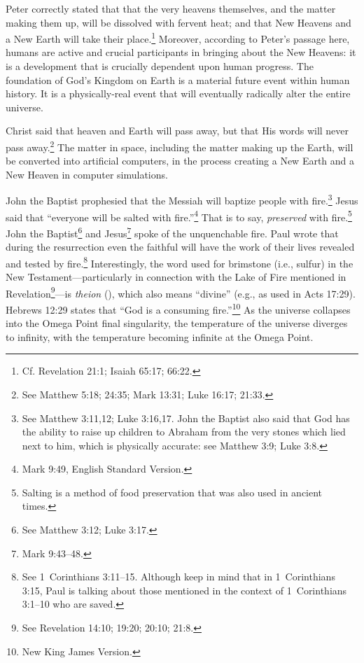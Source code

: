 \documentclass[letterpaper,12pt]{article}
\begin{document}
Peter correctly stated that that the very heavens themselves, and the matter making them up, will be dissolved with fervent heat; and that New Heavens and a New Earth will take their place.\footnote{Cf. Revelation 21:1; Isaiah 65:17; 66:22.} Moreover, according to Peter's passage here, humans are active and crucial participants in bringing about the New Heavens: it is a development that is crucially dependent upon human progress. The foundation of God's Kingdom on Earth is a material future event within human history. It is a physically-real event that will eventually radically alter the entire universe.

Christ said that heaven and Earth will pass away, but that His words will never pass away.\footnote{See Matthew 5:18; 24:35; Mark 13:31; Luke 16:17; 21:33.} The matter in space, including the matter making up the Earth, will be converted into artificial computers, in the process creating a New Earth and a New Heaven in computer simulations.

John the Baptist prophesied that the Messiah will baptize people with fire.\footnote{See Matthew 3:11,12; Luke 3:16,17. John the Baptist also said that God has the ability to raise up children to Abraham from the very stones which lied next to him, which is physically accurate: see Matthew 3:9; Luke 3:8.} Jesus said that ``everyone will be salted with fire.''\footnote{Mark 9:49, English Standard Version.} That is to say, \emph{preserved} with fire.\footnote{Salting is a method of food preservation that was also used in ancient times.} John the Baptist\footnote{See Matthew 3:12; Luke 3:17.} and Jesus\footnote{Mark 9:43--48.} spoke of the unquenchable fire. Paul wrote that during the resurrection even the faithful will have the work of their lives revealed and tested by fire.\footnote{See 1~Corinthians 3:11--15. Although keep in mind that in 1~Corinthians 3:15, Paul is talking about those mentioned in the context of 1~Corinthians 3:1--10 who are saved.} Interestingly, the word used for brimstone (i.e., sulfur) in the New Testament---particularly in connection with the Lake of Fire mentioned in Revelation\footnote{See Revelation 14:10; 19:20; 20:10; 21:8.}---is \emph{theion} (), which also means ``divine'' (e.g., as used in Acts 17:29). Hebrews 12:29 states that ``God is a consuming fire.''\footnote{New King James Version.} As the universe collapses into the Omega Point final singularity, the temperature of the universe diverges to infinity, with the temperature becoming infinite at the Omega Point.
\end{document}
